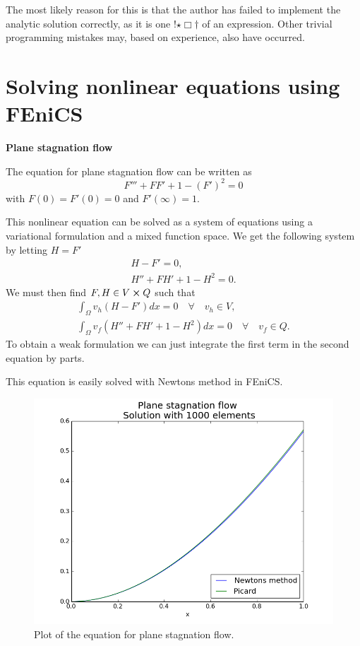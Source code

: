 \documentclass[11pt,a4paper,english]{article}
\numberwithin{equation}{section}
\begin{document}
The most likely reason for this is that the author has failed to implement the analytic solution correctly, as it is one !$\star \Box \dagger$ of an expression. Other trivial programming mistakes may, based on experience, also have occurred.



\section{Solving nonlinear equations using FEniCS}

\textbf{Plane stagnation flow}

The equation for plane stagnation flow can be written as
\begin{equation}
F''' + FF' + 1 - (F')^2 = 0
\end{equation}
with $F(0) = F'(0) = 0$ and $F'(\infty)=1$.

This nonlinear equation can be solved as a system of equations using a variational formulation and a mixed function space. We get the following system by letting $H=F'$
\begin{align}
H - F' = 0, \\
H'' + FH' + 1 - H^2 = 0.
\end{align}
We must then find $F,H \in V \cross Q$ such that 
\begin{align*}
\int_\Omega v_h(H - F') dx =0 \quad \forall \quad v_h \in V, \\
\int_\Omega v_f(H'' + FH' + 1 - H^2) dx = 0 \quad \forall \quad  v_f \in Q.
\end{align*}
To obtain a weak formulation we can just integrate the first term in the second equation by parts. 

This equation is easily solved with Newtons method in FEniCS.

\begin{figure}[h!]
\begin{center}
  \includegraphics[scale=0.4]{plane_stag.png}
  \end{center}
  \caption{Plot of the equation for plane stagnation flow.}
  \label{fig:stokes_square}
\end{figure}
\end{document}
